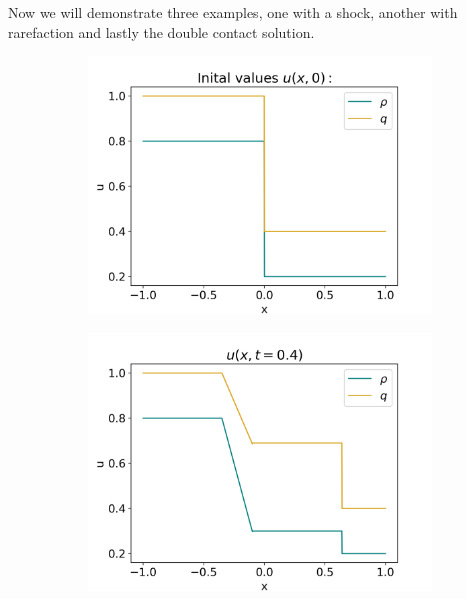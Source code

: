 \documentclass[10pt]{article}
\numberwithin{equation}{section}
\begin{document}
Now we will demonstrate three examples, one with a shock, another with rarefaction and lastly the double contact solution.
\begin{figure}[H]
     \centering
     \begin{subfigure}[t]{0.35\textwidth}
         \centering
         \includegraphics[width=\textwidth]{Figures/Model/SysRarefacIV.png}
     \end{subfigure}
     \begin{subfigure}[t]{0.35\textwidth}
         \centering
         \includegraphics[width=\textwidth]{Figures/Model/SysRarefacAtTime.png}
     \end{subfigure}
     \hfill
     \begin{subfigure}[b]{0.35\textwidth}

\end{subfigure}
\end{figure}
\end{document}

